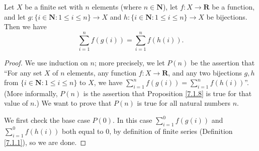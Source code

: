 \setcounter{theorem}{7}
\begin{proposition}\label{7.1.8}
Let \(X\) be a finite set with \(n\) elements (where \(n \in \mathbf{N}\)), let \(f : X \to \mathbf{R}\) be a function, and let \(g : \{i \in \mathbf{N} : 1 \leq i \leq n\} \to X\) and \(h : \{i \in \mathbf{N} : 1 \leq i \leq n\} \to X\) be bijections.
Then we have
\[
    \sum_{i = 1}^n f(g(i)) = \sum_{i = 1}^n f(h(i)).
\]
\end{proposition}

\begin{proof}
We use induction on \(n\);
more precisely, we let \(P(n)\) be the assertion that ``For any set \(X\) of \(n\) elements, any function \(f : X \to \mathbf{R}\), and any two bijections \(g, h\) from \(\{i \in \mathbf{N} : 1 \leq i \leq n\}\) to \(X\), we have \(\sum_{i = 1}^n f(g(i)) = \sum_{i = 1}^n f(h(i))\)''.
(More informally, \(P(n)\) is the assertion that Proposition \ref{7.1.8} is true for that value of \(n\).)
We want to prove that \(P(n)\) is true for all natural numbers \(n\).

We first check the base case \(P(0)\).
In this case \(\sum_{i = 1}^0 f(g(i))\) and \(\sum_{i = 1}^0 f(h(i))\) both equal to \(0\), by definition of finite series (Definition \ref{7.1.1}), so we are done.


\end{proof}
